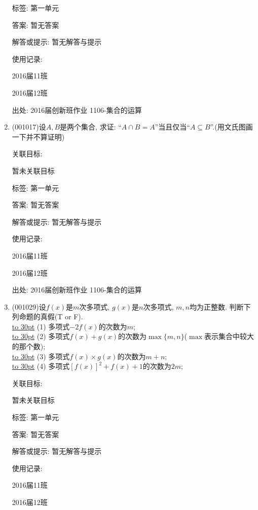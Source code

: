 \documentclass[10pt,a4paper]{article}
\newcommand{\blank}[1]{\underline{\hbox to #1pt{}}}
\begin{document}
\begin{enumerate}[1.]
标签: 第一单元

答案: 暂无答案

解答或提示: 暂无解答与提示

使用记录:

2016届11班	

2016届12班	


出处: 2016届创新班作业	1106-集合的运算
\item { (001017)}设$A,B$是两个集合, 求证: ``$A\cap B=A$''当且仅当``$A \subseteq B$''.(用文氏图画一下并不算证明)


关联目标:

暂未关联目标



标签: 第一单元

答案: 暂无答案

解答或提示: 暂无解答与提示

使用记录:

2016届11班	

2016届12班	


出处: 2016届创新班作业	1106-集合的运算
\item { (001029)}设$f(x)$是$m$次多项式, $g(x)$是$n$次多项式, $m,n$均为正整数. 判断下列命题的真假(T or F).\\ 
\blank{30} (1) 多项式$-2f(x)$的次数为$m$;\\ 
\blank{30} (2) 多项式$f(x)+g(x)$的次数为$\max\{m,n\}$($\max$表示集合中较大的那个数);\\ 
\blank{30} (3) 多项式$f(x)\times g(x)$的次数为$m+n$;\\ 
\blank{30} (4) 多项式$[f(x)]^2+f(x)+1$的次数为$2m$;


关联目标:

暂未关联目标



标签: 第一单元

答案: 暂无答案

解答或提示: 暂无解答与提示

使用记录:

2016届11班				

2016届12班				



\end{enumerate}
\end{document}

